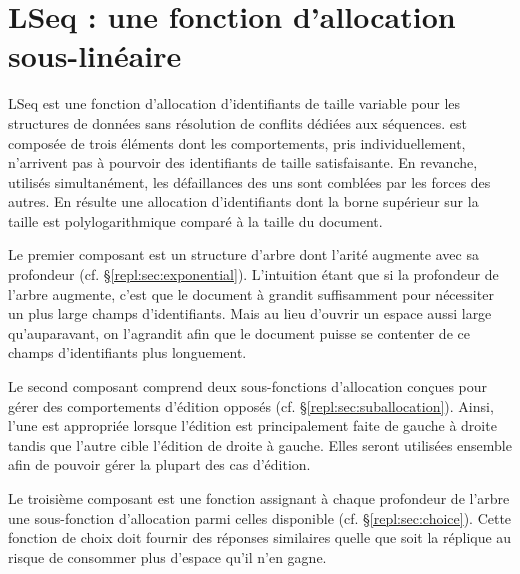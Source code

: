 
\chapter{LSeq : une fonction d'allocation sous-linéaire}
\label{repl:chap:lseq}
\minitoc

\lettrine{L}Seq est une fonction d'allocation d'identifiants de taille variable
pour les structures de données sans résolution de conflits dédiées aux
séquences. \LSEQ est composée de trois éléments dont les comportements, pris
individuellement, n'arrivent pas à pourvoir des identifiants de taille
satisfaisante. En revanche, utilisés simultanément, les défaillances des uns
sont comblées par les forces des autres. En résulte une allocation
d'identifiants dont la borne supérieur sur la taille est polylogarithmique
comparé à la taille du document.

Le premier composant est un structure d'arbre dont l'arité augmente avec sa
profondeur (cf. §\ref{repl:sec:exponential}). L'intuition étant que si la
profondeur de l'arbre augmente, c'est que le document à grandit suffisamment
pour nécessiter un plus large champs d'identifiants. Mais au lieu d'ouvrir un
espace aussi large qu'auparavant, on l'agrandit afin que le document puisse se
contenter de ce champs d'identifiants plus longuement.

Le second composant comprend deux sous-fonctions d'allocation conçues pour gérer
des comportements d'édition opposés (cf. §\ref{repl:sec:suballocation}). Ainsi,
l'une est appropriée lorsque l'édition est principalement faite de gauche à
droite tandis que l'autre cible l'édition de droite à gauche. Elles seront
utilisées ensemble afin de pouvoir gérer la plupart des cas d'édition.

Le troisième composant est une fonction assignant à chaque profondeur de l'arbre
une sous-fonction d'allocation parmi celles disponible
(cf. §\ref{repl:sec:choice}). Cette fonction de choix doit fournir des réponses
similaires quelle que soit la réplique au risque de consommer plus d'espace
qu'il n'en gagne.
